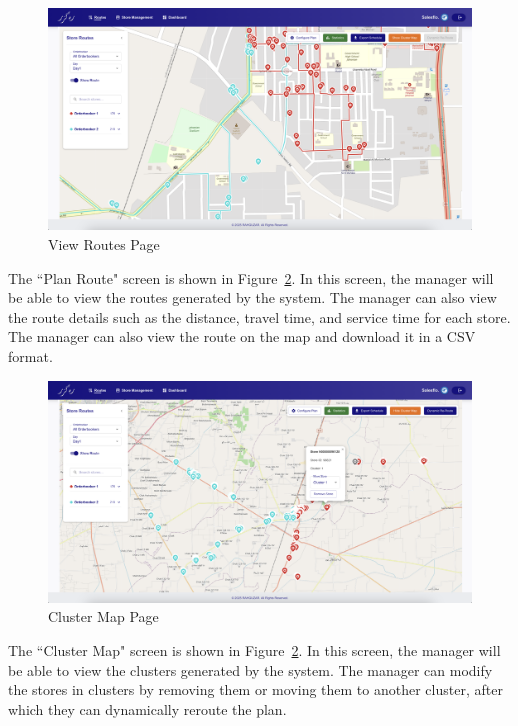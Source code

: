 \begin{figure}[H]
    \centering
    \includegraphics[width=1\textwidth]{images/plan.png} %
    \caption{View Routes Page}
    \label{fig:image6}
\end{figure}
The ``Plan Route" screen is shown in Figure~\ref{fig:image6}. In this screen, the manager will be able to view the routes generated by the system. The manager can also view the route details such as the distance, travel time, and service time for each store. The manager can also view the route on the map and download it in a CSV format.

\begin{figure}[H]
    \centering
    \includegraphics[width=1\textwidth]{images/Clustermap.png} %
    \caption{Cluster Map Page}
    \label{fig:image6}
\end{figure}
The ``Cluster Map" screen is shown in Figure~\ref{fig:image6}. In this screen, the manager will be able to view the clusters generated by the system. The manager can modify the stores in clusters by removing them or moving them to another cluster, after which they can dynamically reroute the plan.

